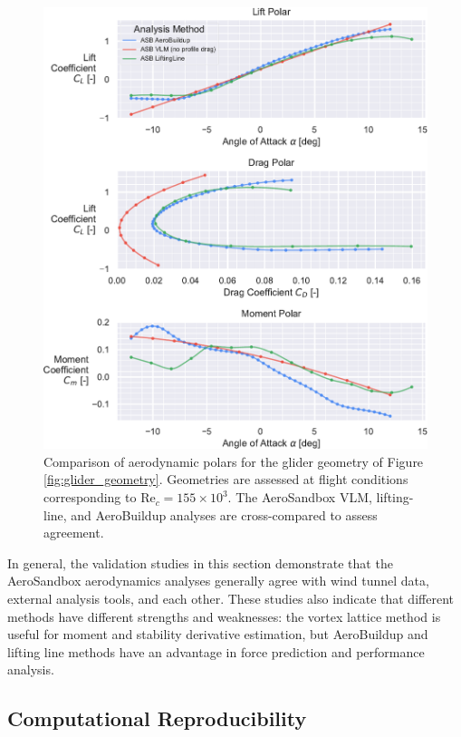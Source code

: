 \begin{figure}[!htb]
    \centering
    \includegraphics[width=\textwidth]{../figures/aero_validation/glider_polars-crop.pdf}
    \caption{Comparison of aerodynamic polars for the glider geometry of Figure \ref{fig:glider_geometry}. Geometries are assessed at flight conditions corresponding to $\text{Re}_c = 155 \times 10^3$. The AeroSandbox VLM, lifting-line, and AeroBuildup analyses are cross-compared to assess agreement.}
    \label{fig:glider_results}
\end{figure}

In general, the validation studies in this section demonstrate that the AeroSandbox aerodynamics analyses generally agree with wind tunnel data, external analysis tools, and each other. These studies also indicate that different methods have different strengths and weaknesses: the vortex lattice method is useful for moment and stability derivative estimation, but AeroBuildup and lifting line methods have an advantage in force prediction and performance analysis.

\subsection{Computational Reproducibility}

